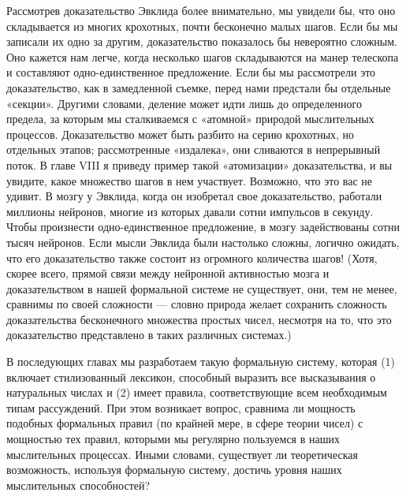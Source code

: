 Рассмотрев доказательство Эвклида более внимательно, мы увидели бы, что оно складывается из многих крохотных, почти бесконечно малых шагов. Если бы мы записали их одно за другим, доказательство показалось бы невероятно сложным. Оно кажется нам легче, когда несколько шагов складываются на манер телескопа и составляют одно-единственное предложение. Если бы мы рассмотрели это доказательство, как в замедленной съемке, перед нами предстали бы отдельные «секции». Другими словами, деление может идти лишь до определенного предела, за которым мы сталкиваемся с «атомной» природой мыслительных процессов. Доказательство может быть разбито на серию крохотных, но отдельных этапов; рассмотренные «издалека», они сливаются в непрерывный поток. В главе VIII я приведу пример такой «атомизации» доказательства, и вы увидите, какое множество шагов в нем участвует. Возможно, что это вас не удивит. В мозгу у Эвклида, когда он изобретал свое доказательство, работали миллионы нейронов, многие из которых давали сотни импульсов в секунду. Чтобы произнести одно-единственное предложение, в мозгу задействованы сотни тысяч нейронов. Если мысли Эвклида были настолько сложны, логично ожидать, что его доказательство также состоит из огромного количества шагов! (Хотя, скорее всего, прямой связи между нейронной активностью мозга и доказательством в нашей формальной системе не существует, они, тем не менее, сравнимы по своей сложности --- словно природа желает сохранить сложность доказательства бесконечного множества простых чисел, несмотря на то, что это доказательство представлено в таких различных системах.)

В последующих главах мы разработаем такую формальную систему, которая (1) включает стилизованный лексикон, способный выразить все высказывания о натуральных числах и (2) имеет правила, соответствующие всем необходимым типам рассуждений. При этом возникает вопрос, сравнима ли мощность подобных формальных правил (по крайней мере, в сфере теории чисел) с мощностью тех правил, которыми мы регулярно пользуемся в наших мыслительных процессах. Иными словами, существует ли теоретическая возможность, используя формальную систему, достичь уровня наших мыслительных способностей?

